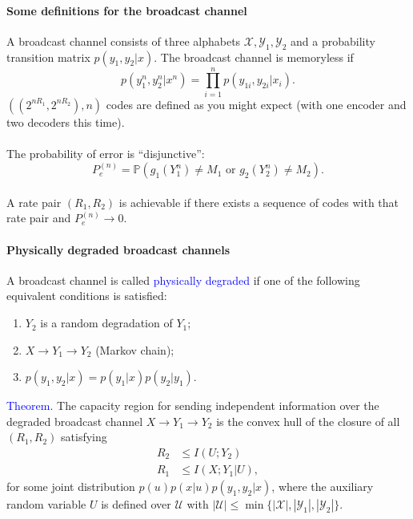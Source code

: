 \documentclass[a4paper, 11pt, openany]{book}
\numberwithin{equation}{section}
\theoremstyle{plain}
\theoremstyle{definition}
\newcommand{\probability}{\mathbb{P}}
\newcommand{\Structure}[1]{\textcolor{blue}{#1}}
\newcommand{\alphabet}[1]{\mathcal{#1}}
\begin{document}
\paragraph{Some definitions for the broadcast channel}
A broadcast channel consists of three alphabets $\alphabet{X}, \alphabet{Y}_1, \alphabet{Y}_2$ and a probability transition matrix $p(y_1, y_2 | x)$. The broadcast channel is memoryless if
\[
	p(y_1^n, y_2^n | x^n) = \prod_{i=1}^n p(y_{1i}, y_{2i} | x_i).
\]
$((2^{nR_1}, 2^{nR_2}), n)$ codes are defined as you might expect (with one encoder and two decoders this time).\\
~\\
The probability of error is ``disjunctive'':
\[
	P_e^{(n)} = \probability( g_1(Y_1^n) \ne M_1 \text{ or } g_2(Y_2^n) \ne M_2 ).
\]
~\\
A rate pair $(R_1, R_2)$ is achievable if there exists a sequence of codes with that rate pair and $P_e^{(n)} \to 0$.



\paragraph{Physically degraded broadcast channels}
A broadcast channel is called \Structure{physically degraded} if one of the following equivalent conditions is satisfied:
\begin{enumerate}
	\item $Y_2$ is a random degradation of $Y_1$;
	
	\item $X \to Y_1 \to Y_2$ (Markov chain);
	
	\item $p(y_1, y_2 | x) = p(y_1 | x) p(y_2 | y_1)$.
\end{enumerate}

\Structure{Theorem.} The capacity region for sending independent information over the degraded broadcast channel $X \to Y_1 \to Y_2$ is the convex hull of the closure of all $(R_1, R_2)$ satisfying
\begin{align*}
	R_2 &\le I(U; Y_2)\\
	R_1 &\le I(X; Y_1 | U),
\end{align*}
for some joint distribution $p(u) p(x | u) p(y_1, y_2 | x)$, where the auxiliary random variable $U$ is defined over $\alphabet{U}$ with $|\alphabet{U}| \le \min \{ |\alphabet{X}|, |\alphabet{Y}_1|, |\alphabet{Y}_2| \}$.
\end{document}
